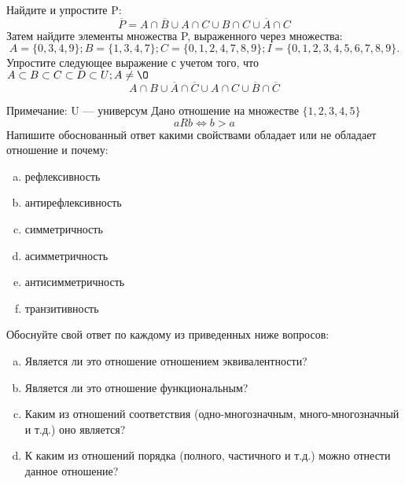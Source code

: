 \documentclass[10pt]{exam}
\begin{document}
\begin{questions}
\question
Найдите и упростите P:
\begin{equation*}
\overline{P} = A \cap \overline{B} \cup A \cap C \cup B \cap C \cup \overline{A} \cap C
\end{equation*}
Затем найдите элементы множества P, выраженного через множества:
\begin{equation*}
A = \{0, 3, 4, 9\}; 
B = \{1, 3, 4, 7\};
C = \{0, 1, 2, 4, 7, 8, 9\};
I = \{0, 1, 2, 3, 4, 5, 6, 7, 8, 9\}.
\end{equation*}\question
Упростите следующее выражение с учетом того, что $A\subset B \subset C \subset D \subset U; A \neq \O$
\begin{equation*}
A \cap B \cup \overline{A} \cap \overline{C} \cup A \cap C \cup \overline{B} \cap \overline{C}
\end{equation*}

Примечание: U — универсум\question
Дано отношение на множестве $\{1, 2, 3, 4, 5\}$ 
\begin{equation*}
aRb \iff b > a
\end{equation*}
Напишите обоснованный ответ какими свойствами обладает или не обладает отношение и почему:   
\begin{enumerate} [a)]\setcounter{enumi}{0}
\item рефлексивность
\item антирефлексивность
\item симметричность
\item асимметричность
\item антисимметричность
\item транзитивность
\end{enumerate}

Обоснуйте свой ответ по каждому из приведенных ниже вопросов:
\begin{enumerate} [a)]\setcounter{enumi}{0}
    \item Является ли это отношение отношением эквивалентности?
    \item Является ли это отношение функциональным?
    \item Каким из отношений соответствия (одно-многозначным, много-многозначный и т.д.) оно является?
    \item К каким из отношений порядка (полного, частичного и т.д.) можно отнести данное отношение?
\end{enumerate}


\end{questions}
\end{document}
